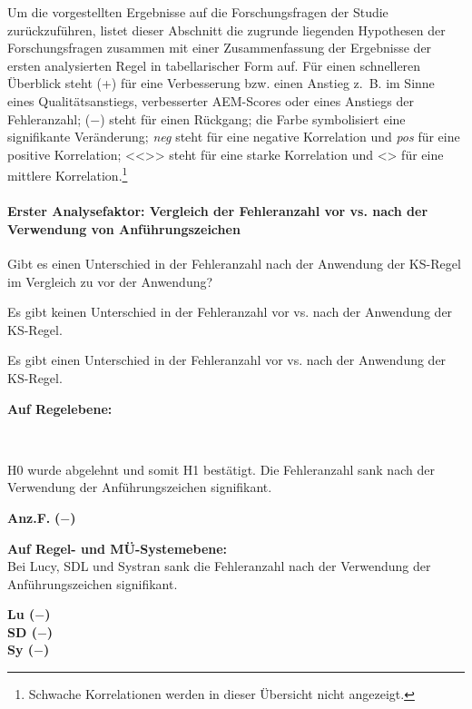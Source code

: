 Um die vorgestellten Ergebnisse auf die Forschungsfragen der Studie zurückzuführen, listet dieser Abschnitt die zugrunde liegenden Hypothesen der Forschungsfragen zusammen mit einer Zusammenfassung der Ergebnisse der ersten analysierten Regel in tabellarischer Form auf. Für einen schnelleren Überblick steht (+) für eine Verbesserung bzw. einen Anstieg z.~B. im Sinne eines Qualitätsanstiegs, verbesserter AEM-Scores oder eines Anstiegs der Fehleranzahl; ($-$) steht für einen Rückgang; die  Farbe symbolisiert eine signifikante Veränderung; \textit{neg} steht für eine negative Korrelation und \textit{pos} für eine positive Korrelation; <{}<{}>{}> steht für eine starke Korrelation und <> für eine mittlere Korrelation.\footnote{\textrm{Schwache Korrelationen werden in dieser Übersicht nicht angezeigt.}}


\paragraph*{Erster Analysefaktor: Vergleich der Fehleranzahl vor vs. nach der Verwendung von Anführungszeichen}
\begin{description}[font=\normalfont\bfseries]
\item [Fragestellung:] Gibt es einen Unterschied in der Fehleranzahl nach der Anwendung der KS-Regel im Vergleich zu vor der Anwendung?
\item [H0 --] Es gibt keinen Unterschied in der Fehleranzahl vor vs. nach der Anwendung der KS-Regel.
\item [H1 --] Es gibt einen Unterschied in der Fehleranzahl vor vs. nach der Anwendung der KS-Regel.
\item[Resultat] {}
\end{description}
\parbox[t]{.8\textwidth}{\textbf{Auf Regelebene:}}\\
\noindent
\parbox[t]{.8\textwidth}{
H0 wurde abgelehnt und somit H1 bestätigt.
Die Fehleranzahl sank nach der Verwendung der Anführungszeichen signifikant.
}
\parbox[t]{.04\textwidth}{}
\colorbox{smGreen}{\parbox[t]{.15\textwidth}{
\textbf{Anz.F.} \textbf{($-$)}\\
}}

\noindent
\parbox[t]{.8\textwidth}{\textbf{Auf Regel- und MÜ-Systemebene:}\\
Bei Lucy, SDL und Systran sank die Fehleranzahl nach der Verwendung der Anführungszeichen signifikant.
}
\parbox[t]{.04\textwidth}{}
\colorbox{smGreen}{\parbox[t]{.15\textwidth}{
\textbf{Lu ($-$)}\\\textbf{SD ($-$)}\\\textbf{Sy ($-$)}
}}

